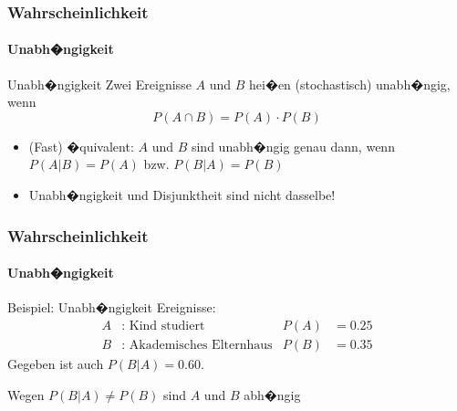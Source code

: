 \documentclass[12pt,show notes]{beamer}
\begin{document}
\begin{frame}
\frametitle{Wahrscheinlichkeit}
\framesubtitle{Unabh�ngigkeit}
\begin{block}{Unabh�ngigkeit}
Zwei Ereignisse $A$ und $B$ hei�en (stochastisch) unabh�ngig, wenn
\[ P(A\cap B) =P(A)\cdot P(B) \]
\end{block}
\begin{itemize}
\item (Fast) �quivalent: $A$ und $B$ sind unabh�ngig genau dann, wenn
$P(A|B)=P(A)$ bzw. $P(B|A)=P(B)$
\item Unabh�ngigkeit und Disjunktheit sind nicht dasselbe!
\end{itemize}
\end{frame}

\begin{frame}
\frametitle{Wahrscheinlichkeit}
\framesubtitle{Unabh�ngigkeit}
\begin{exampleblock}{Beispiel: Unabh�ngigkeit}
Ereignisse:
\begin{align*}
A &:\text{ Kind studiert} &P(A)&=0.25\\
B &:\text{ Akademisches Elternhaus}&P(B)&=0.35
\end{align*}
Gegeben ist auch $P(B|A) =0.60$. 
\medskip

Wegen $P(B|A)\neq P(B)$ sind $A$ und $B$ abh�ngig
\end{exampleblock}
\end{frame}
\end{document}
